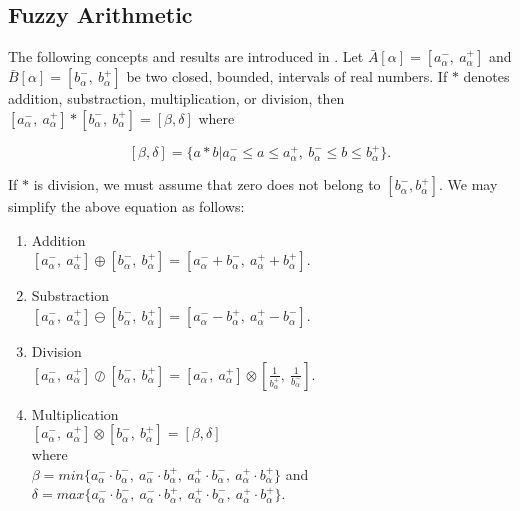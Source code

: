 \documentclass{iaesarticle3}
\begin{document}
\subsection{Fuzzy Arithmetic}

The following concepts and results are introduced in \cite{kau, jam}. Let $ \bar{A}[\alpha] = [a_\alpha^-,\ a_\alpha^+]$ and $\bar{B}[\alpha] = [b_\alpha^-,\ b_\alpha^+]$ be two closed, bounded, intervals of real numbers. If $*$ denotes addition, substraction, multiplication, or division, then $[a_\alpha^-,\ a_\alpha^+] * [b_\alpha^-,\ b_\alpha^+] = [\beta, \delta]$ where

   $$  [\beta, \delta] = \{a * b | a_\alpha^- \leq a \leq a_\alpha^+,~ b_\alpha^- \leq b \leq b_\alpha^+\}.$$

If $*$ is division, we must assume that zero does not belong to $[b_\alpha^-, b_\alpha^+]$. We may simplify the above equation as follows:

\begin{enumerate}
    \item Addition\\
        $[a_\alpha^-,\ a_\alpha^+] \oplus [b_\alpha^-,\ b_\alpha^+] = [a_\alpha^- + b_\alpha^-,\ a_\alpha^+ + b_\alpha^+]$.
    \item Substraction\\
        $[a_\alpha^-,\ a_\alpha^+] \ominus [b_\alpha^-,\ b_\alpha^+] = [a_\alpha^- - b_\alpha^+,\ a_\alpha^+ - b_\alpha^-]$.
    \item Division \\
        $[a_\alpha^-,\ a_\alpha^+] \oslash [b_\alpha^-,\ b_\alpha^+] = [a_\alpha^-,\ a_\alpha^+] \otimes [\frac{1}{b_\alpha^+},\ \frac{1}{b_\alpha^-}]$.
    \item Multiplication\\
        $[a_\alpha^-,\ a_\alpha^+] \otimes [b_\alpha^-,\ b_\alpha^+] = [\beta, \delta]$ \\
        where\\ $\beta = min\{a_\alpha^-\cdot b_\alpha^-,\ a_\alpha^-\cdot b_\alpha^+,\ a_\alpha^+\cdot b_\alpha^-,\ a_\alpha^+\cdot b_\alpha^+ \}$ and\\
        $\delta = max\{a_\alpha^-\cdot b_\alpha^-,\ a_\alpha^-\cdot b_\alpha^+,\ a_\alpha^+\cdot b_\alpha^-,\ a_\alpha^+\cdot b_\alpha^+ \}$.
\end{enumerate}
\end{document}
